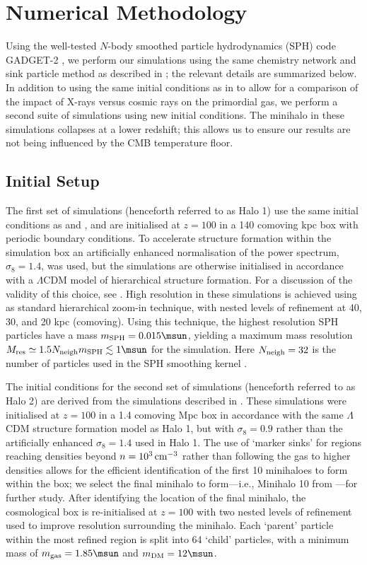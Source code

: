 \section{Numerical Methodology}
\label{sec:methods}
Using the well-tested $N$-body smoothed particle hydrodynamics (SPH) code GADGET-2 \citep{Springel2005}, we perform our simulations using the same chemistry network and sink particle method as described in \citet{Hummeletal2015}; the relevant details are summarized below.  In addition to using the same initial conditions as in \citet{Hummeletal2015} to allow for a comparison of the impact of X-rays versus cosmic rays on the primordial gas, we perform a second suite of simulations using new initial conditions.  The minihalo in these simulations collapses at a lower redshift; this allows us to ensure our results are not being influenced by the CMB temperature floor.

\subsection{Initial Setup}
\label{setup}
The first set of simulations (henceforth referred to as Halo 1) use the same initial conditions as \citet{Hummeletal2015} and \citet{StacyGreifBromm2010}, and are initialised at $z=100$ in a 140 comoving kpc box with periodic boundary conditions. To accelerate structure formation within the simulation box an artificially enhanced normalisation of the power spectrum, $\sigma_8 = 1.4$, was used, but the simulations are otherwise initialised in accordance with a $\Lambda$CDM model of hierarchical structure formation. For a discussion of the validity of this choice, see \citet{StacyGreifBromm2010}. High resolution in these simulations is achieved using as standard hierarchical zoom-in technique, with nested levels of refinement at 40, 30, and 20 kpc (comoving).  Using this technique, the highest resolution SPH particles have a mass $m_{\rm SPH} = 0.015\msun$, yielding a maximum mass resolution $M_{\rm res} \simeq 1.5 N_{\rm neigh} m_{\rm SPH} \lesssim 1\msun$ for the simulation.  Here $N_{\rm neigh} = 32$ is the number of particles used in the SPH smoothing kernel \citep{BateBurkert1997}.

The initial conditions for the second set of simulations (henceforth referred to as Halo 2) are derived from the simulations described in \citet{StacyBromm2013}.  These simulations were initialised at $z=100$ in a 1.4 comoving Mpc box in accordance with the same $\Lambda$CDM structure formation model as Halo 1, but with $\sigma_8 = 0.9$ rather than the artificially enhanced $\sigma_8 = 1.4$ used in Halo 1. The use of `marker sinks'  for regions reaching densities beyond $n=10^3\,{\rm cm}^{-3}$ rather than following the gas to higher densities allows for the efficient identification of the first 10 minihaloes to form within the box; we select the final minihalo to form---i.e., Minihalo 10 from \citet{StacyBromm2013}---for further study.  After identifying the location of the final minihalo, the cosmological box is re-initialised at $z=100$  with two nested levels of refinement used to improve resolution surrounding the minihalo.  Each `parent' particle within the most refined region is split into 64 `child' particles, with a minimum mass of $m_{\rm gas}=1.85\msun$ and $m_{\rm \small DM}=12\msun$.